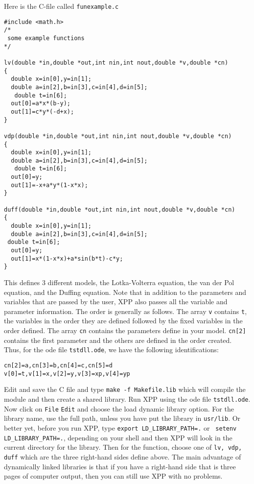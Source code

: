 \documentclass{article}
\begin{document}
Here is the C-file called {\tt funexample.c}
\begin{verbatim}
#include <math.h>
/*  
 some example functions
*/

lv(double *in,double *out,int nin,int nout,double *v,double *cn)
{
  double x=in[0],y=in[1];
  double a=in[2],b=in[3],c=in[4],d=in[5];
   double t=in[6];
  out[0]=a*x*(b-y);
  out[1]=c*y*(-d+x);
}

vdp(double *in,double *out,int nin,int nout,double *v,double *cn)
{
  double x=in[0],y=in[1];
  double a=in[2],b=in[3],c=in[4],d=in[5];
   double t=in[6];
  out[0]=y;
  out[1]=-x+a*y*(1-x*x);
}

duff(double *in,double *out,int nin,int nout,double *v,double *cn)
{
  double x=in[0],y=in[1];
  double a=in[2],b=in[3],c=in[4],d=in[5];
 double t=in[6];
  out[0]=y;
  out[1]=x*(1-x*x)+a*sin(b*t)-c*y;
}
\end{verbatim}
This defines 3 different models, the Lotka-Volterra equation,
the van der Pol equation, and the Duffing equation. Note that in
addition to the parameters and variables that are passed by the user,
XPP also passes all the variable and parameter information. The order
is generally as follows. The array {\tt v} contains {\tt t},
the variables in the order they are defined followed by the fixed
variables in the order defined. The array {\tt cn} contains the
parameters define in your model. {\tt cn[2]} contains the first
parameter and the others are defined in the order created. Thus, for
the ode file {\tt tstdll.ode}, we have the following identifications:
\begin{verbatim}
cn[2]=a,cn[3]=b,cn[4]=c,cn[5]=d
v[0]=t,v[1]=x,v[2]=y,v[3]=xp,v[4]=yp
\end{verbatim}
  



Edit and save the C file and 
type {\tt make -f Makefile.lib} which will compile the
module and then create a shared library.  Run XPP using the ode file
{\tt tstdll.ode}. Now click on {\tt File} {\tt Edit} and choose the
load dynamic library option. For the library name, use the full path,
unless you have put the library in {\tt usr/lib}. Or better yet,
before you run XPP, type {\tt export LD\_LIBRARY\_PATH=.} or {\tt
setenv LD\_LIBRARY\_PATH=.}, depending on your shell and then XPP will
look in the current directory for the library.
Then for the
function, choose one of {\tt lv, vdp, duff} which are the three
right-hand sides define above.  The main advantage of dynamically
linked libraries is that if you have a right-hand side that is three
pages of computer output, then you can still use XPP with no
problems. 
\end{document}
